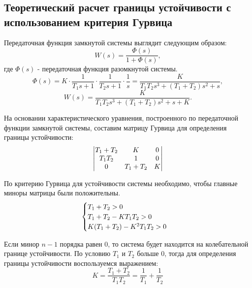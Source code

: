 \documentclass[a4paper,12pt]{article} %
\begin{document}
\newpage
\begin{center}
    \section{Теоретический расчет границы устойчивости с использованием критерия Гурвица}
\end{center}
 
 
Передаточная функция замкнутой системы выглядит следующим образом:
\begin{equation} W(s) = \frac{\Phi(s)}{1 + \Phi(s)}, \end{equation}
где $\Phi(s)$ - передаточная функция разомкнутой системы.
\begin{equation} 
\Phi(s) = K\cdot\frac{1}{T_1s + 1}\cdot\frac{1}{T_2s + 1}\cdot\frac{1}{s} = \frac{K}{T_1T_2s^3 + (T_1 + T_2)s^2 +s},
\end{equation}
 \begin{equation} W(s) = \frac{K}{T_1T_2s^3 + (T_1 + T_2)s^2 +s + K}. \end{equation}
\par
На основании характеристического уравнения, построенного по передаточной функции замкнутой системы, составим матрицу Гурвица для определения границы устойчивости:
\[
\begin{vmatrix}
$$T_1 + T_2$$ & $$K$$ & 0\\
$$T_1T_2$$ & 1 & 0\\
0 & $$T_1 + T_2$$ & $$K$$
\end{vmatrix}
\]
\par
По критерию Гурвица для устойчивости системы необходимо, чтобы главные миноры матрицы были положительны. 
\begin{equation}
    \begin{cases}
        $$T_1 + T_2 > 0$$\\
        $$T_1 + T_2 - KT_1T_2 > 0$$\\
        $$K(T_1 + T_2) - K^2T_1T_2 > 0$$
    \end{cases}
\end{equation}
\par
Если минор $n - 1$ порядка равен 0, то система будет находится на колебательной границе устойчивости. По условию $T_1$ и $T_2$ больше 0, тогда для определения границы устойчивости воспользуемся выражением:
\begin{equation}
    K = \frac{T_1 + T_2}{T_1T_2} =  \frac{1}{T_1} + \frac{1}{T_2}
\end{equation}
    
\end{document}
